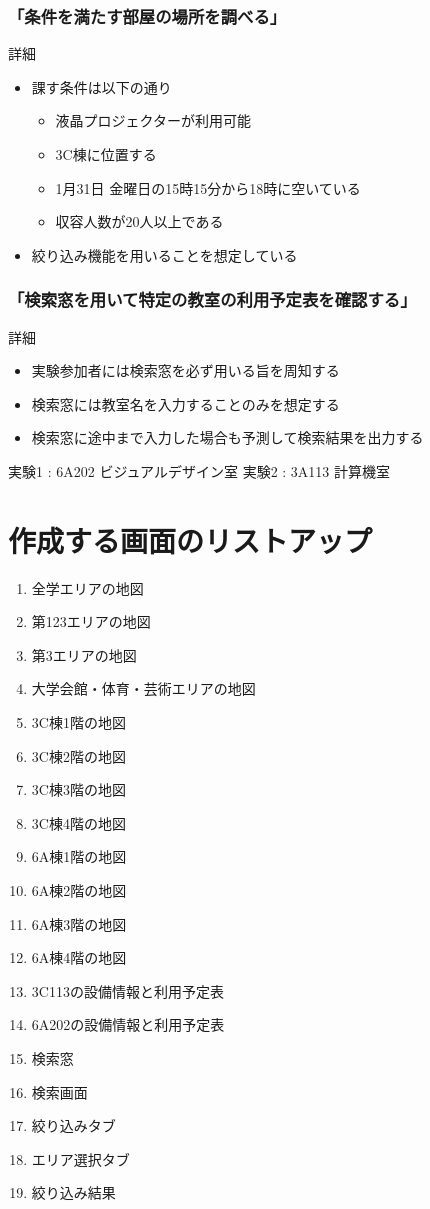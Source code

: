 \documentclass[12pt,a4paper,dvipdf]{jsarticle}
\begin{document}
\subsubsection{「条件を満たす部屋の場所を調べる」}
詳細
\begin{itemize}
    \item 課す条件は以下の通り
          \begin{itemize}
              \item 液晶プロジェクターが利用可能
              \item 3C棟に位置する
              \item 1月31日 金曜日の15時15分から18時に空いている
              \item 収容人数が20人以上である
          \end{itemize}
    \item 絞り込み機能を用いることを想定している
\end{itemize}

\subsubsection{「検索窓を用いて特定の教室の利用予定表を確認する」}
詳細
\begin{itemize}
    \item 実験参加者には検索窓を必ず用いる旨を周知する
    \item 検索窓には教室名を入力することのみを想定する
    \item 検索窓に途中まで入力した場合も予測して検索結果を出力する
\end{itemize}
実験1 : 6A202 ビジュアルデザイン室
実験2 : 3A113 計算機室


\section{作成する画面のリストアップ}
\begin{enumerate}
    \item 全学エリアの地図
    \item 第123エリアの地図
    \item 第3エリアの地図
    \item 大学会館・体育・芸術エリアの地図
    \item 3C棟1階の地図
    \item 3C棟2階の地図
    \item 3C棟3階の地図
    \item 3C棟4階の地図
    \item 6A棟1階の地図
    \item 6A棟2階の地図
    \item 6A棟3階の地図
    \item 6A棟4階の地図
    \item 3C113の設備情報と利用予定表
    \item 6A202の設備情報と利用予定表
    \item 検索窓
    \item 検索画面
    \item 絞り込みタブ
    \item エリア選択タブ
    \item 絞り込み結果
\end{enumerate}
\end{document}
